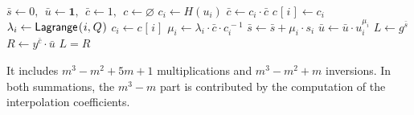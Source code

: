 \documentclass[psamsfonts, reqno]{amsart}
\theoremstyle{definition}
\theoremstyle{remark}
\numberwithin{equation}{section}
\begin{document}
\begin{algorithmic}[1]
	\vspace{5pt}
	\State
    	$\bar{s} \leftarrow 0,
		\ \ \bar{u} \leftarrow \mathbf{1},
		\ \ \bar{c} \leftarrow 1,
		\ \ c \leftarrow \varnothing$
    	\vspace{2pt}
	\vspace{2pt}
		\State
    		$c_i \leftarrow H(u_i)$
    		\vspace{2pt}
    	\State
    		$\bar{c} \leftarrow c_i \cdot \bar{c}$
    		\vspace{2pt}
    	\State
    		$c\hspace{1pt}[\hspace{1pt}i\hspace{1pt}] \leftarrow c_i$
    		\vspace{2pt}
	\EndFor
	\vspace{2pt}
		\State
    		$\lambda_i \leftarrow \mathsf{Lagrange}\hspace{1pt}(
    			\hspace{0.5pt}
    			i,
    			\hspace{0.5pt}
    			Q
    			\hspace{0.5pt}
    		)$
    		\vspace{2pt}
    	\State
    		$c_i \leftarrow c\hspace{1pt}[\hspace{1pt} i \hspace{1pt}]$
    		\vspace{2pt}
		\State
    		$\mu_i \leftarrow
    			\lambda_i \cdot
    			\bar{c} \cdot
    			c_i ^ {\hspace{1pt}-1}$
    		\vspace{2pt}
    	\State
    		$\bar{s} \leftarrow \bar{s} + \mu_i \cdot s_i$
    		\vspace{2pt}
    	\State
    		$\bar{u} \leftarrow \bar{u} \cdot u_i ^ {\mu_i}$
    		\vspace{0pt}
	\EndFor
	\State
		$L \leftarrow g ^ {\bar{s}}$
		\vspace{2pt}
	\State
		$R \leftarrow y ^ {\bar{c}} \cdot \bar{u}$
		\vspace{2pt}
	\State
		\Return $L = R$
\vspace{5pt}
\end{algorithmic}

\noindent
It includes $m^3 - m ^ 2 + 5m + 1$ multiplications
and $m^3 - m ^ 2 + m$ inversions.
In both summations, the $m^3 - m$ part is
contributed by the computation of the interpolation coefficients.
\end{document}
